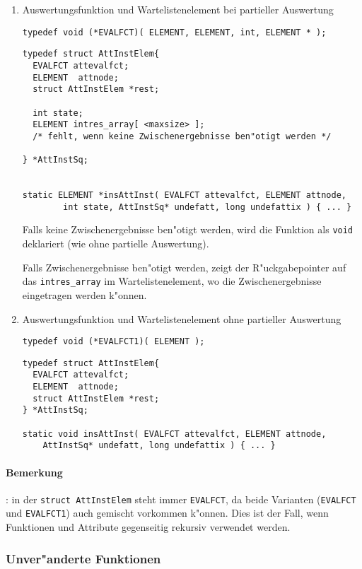 \begin{enumerate}
\item Auswertungsfunktion und Wartelistenelement bei partieller Auswertung

{\tt typedef void (*EVALFCT)( ELEMENT, ELEMENT, int, ELEMENT * );}

\begin{verbatim}
typedef struct AttInstElem{
  EVALFCT attevalfct;
  ELEMENT  attnode;
  struct AttInstElem *rest;

  int state;
  ELEMENT intres_array[ <maxsize> ];
  /* fehlt, wenn keine Zwischenergebnisse ben"otigt werden */

} *AttInstSq;


static ELEMENT *insAttInst( EVALFCT attevalfct, ELEMENT attnode,
        int state, AttInstSq* undefatt, long undefattix ) { ... }
\end{verbatim}

Falls keine Zwischenergebnisse ben"otigt werden, wird die Funktion als {\tt void}
deklariert (wie ohne partielle Auswertung).

Falls Zwischenergebnisse ben"otigt werden, zeigt der R"uckgabepointer auf
das {\tt intres\_array} im Wartelistenelement, wo die Zwischenergebnisse
eingetragen werden k"onnen.

\item Auswertungsfunktion und Wartelistenelement ohne partieller Auswertung

{\tt typedef void (*EVALFCT1)( ELEMENT );}

\begin{verbatim}
typedef struct AttInstElem{
  EVALFCT attevalfct;
  ELEMENT  attnode;
  struct AttInstElem *rest;
} *AttInstSq;

static void insAttInst( EVALFCT attevalfct, ELEMENT attnode,
	AttInstSq* undefatt, long undefattix ) { ... }
\end{verbatim}

\end{enumerate}

\paragraph{Bemerkung}: in der {\tt struct AttInstElem} steht immer {\tt EVALFCT},
da beide Varianten ({\tt EVALFCT} und {\tt EVALFCT1}) auch gemischt vorkommen k"onnen.
Dies ist der Fall, wenn Funktionen und Attribute gegenseitig rekursiv verwendet werden.

\subsubsection*{Unver"anderte Funktionen}

